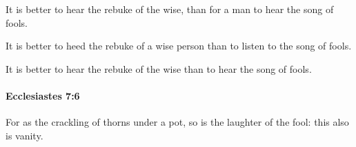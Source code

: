 			\begin{versebox}
					\item[BHS] 
					\item[LXX] 
					\item[ASV] It is better to hear the rebuke of the wise, than for a man to hear the song of fools.
					\item[NIV] It is better to heed the rebuke of a wise person than to listen to the song of fools.
					\item[NRSV] It is better to hear the rebuke of the wise than to hear the song of fools.
			\end{versebox}

		\paragraph{Ecclesiastes 7:6} %
			\label{ECCLESIASTES-7-6}

			For as the crackling of thorns under a pot, so is the laughter of the fool: this also is vanity.


